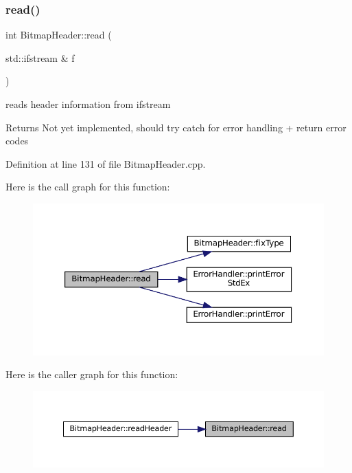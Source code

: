 \subsubsection{\texorpdfstring{read()}{read()}}
{\footnotesize\ttfamily int Bitmap\+Header\+::read (\begin{DoxyParamCaption}\item[{std\+::ifstream \&}]{f }\end{DoxyParamCaption})\hspace{0.3cm}{\ttfamily [private]}}



reads header information from ifstream 

\begin{DoxyReturn}{Returns}
Not yet implemented, should try catch for error handling + return error codes 
\end{DoxyReturn}


Definition at line 131 of file Bitmap\+Header.\+cpp.

Here is the call graph for this function\+:\nopagebreak
\begin{figure}[H]
\begin{center}
\leavevmode
\includegraphics[width=350pt]{classBitmapHeader_aebc19bf8a908f1f7edfc5b10186c9db8_cgraph}
\end{center}
\end{figure}
Here is the caller graph for this function\+:\nopagebreak
\begin{figure}[H]
\begin{center}
\leavevmode
\includegraphics[width=350pt]{classBitmapHeader_aebc19bf8a908f1f7edfc5b10186c9db8_icgraph}
\end{center}
\end{figure}
\mbox{\label{classBitmapHeader_a2de360d5111136167f5885bed561bc8c}} 
